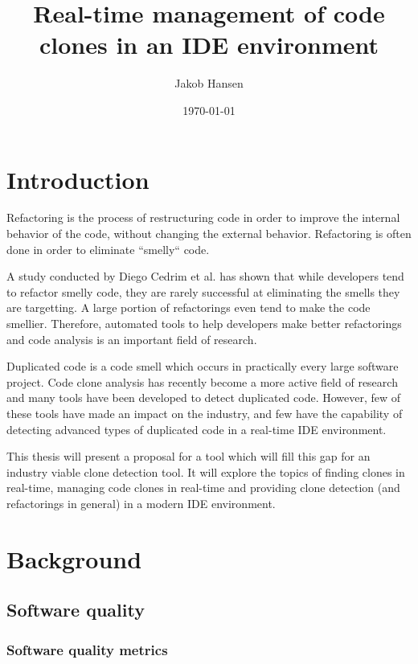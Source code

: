 \documentclass[12pt]{article}
\title{Real-time management of code clones in an IDE environment}
\author{Jakob Hansen}
\date{\today}
\begin{document}
\maketitle

\tableofcontents

\section{Introduction}

Refactoring is the process of restructuring code in order to improve the internal behavior
of the code, without changing the external behavior.\cite[9]{fowlerrefactoring} Refactoring
is often done in order to eliminate ``smelly`` code.

A study conducted by Diego Cedrim et al.\cite{Rohit_Gheyi_Impact} has shown that while
developers tend to refactor smelly code, they are rarely successful at eliminating the
smells they are targetting. A large portion of refactorings even tend to make the code
smellier. Therefore, automated tools to help developers make better refactorings and code
analysis is an important field of research.

Duplicated code is a code smell which occurs in practically every large software project.
Code clone analysis has recently become a more active field of research and many tools have
been developed to detect duplicated code.\cite[7]{Inoue_introduction_to_cc} However, few of
these tools have made an impact on the industry, and few have the capability of detecting
advanced types of duplicated code in a real-time IDE environment. 

This thesis will present a proposal for a tool which will fill this gap for an industry viable
clone detection tool. It will explore the topics of finding clones in real-time, managing
code clones in real-time and providing clone detection (and refactorings in general) in
a modern IDE environment.

\section{Background}

\subsection{Software quality}

\subsubsection{Software quality metrics}
\end{document}
